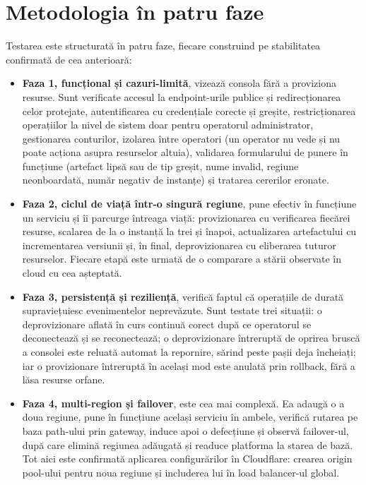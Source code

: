 \documentclass[12pt,a4paper]{report}
\begin{document}
\section{Metodologia în patru faze}
Testarea este structurată în patru faze, fiecare construind pe stabilitatea confirmată de cea anterioară:

\begin{itemize}
	\item \textbf{Faza 1, funcțional și cazuri-limită}, vizează consola fără a proviziona resurse. Sunt verificate accesul la endpoint-urile publice și redirecționarea celor protejate, autentificarea cu credențiale corecte și greșite, restricționarea operațiilor la nivel de sistem doar pentru operatorul administrator, gestionarea conturilor, izolarea între operatori (un operator nu vede și nu poate acționa asupra resurselor altuia), validarea formularului de punere în funcțiune (artefact lipsă sau de tip greșit, nume invalid, regiune neonboardată, număr negativ de instanțe) și tratarea cererilor eronate.
	\item \textbf{Faza 2, ciclul de viață într-o singură regiune}, pune efectiv în funcțiune un serviciu și îi parcurge întreaga viață: provizionarea cu verificarea fiecărei resurse, scalarea de la o instanță la trei și înapoi, actualizarea artefactului cu incrementarea versiunii și, în final, deprovizionarea cu eliberarea tuturor resurselor. Fiecare etapă este urmată de o comparare a stării observate în cloud cu cea așteptată.
	\item \textbf{Faza 3, persistență și reziliență}, verifică faptul că operațiile de durată supraviețuiesc evenimentelor neprevăzute. Sunt testate trei situații: o deprovizionare aflată în curs continuă corect după ce operatorul se deconectează și se reconectează; o deprovizionare întreruptă de oprirea bruscă a consolei este reluată automat la repornire, sărind peste pașii deja încheiați; iar o provizionare întreruptă în același mod este anulată prin rollback, fără a lăsa resurse orfane.
	\item \textbf{Faza 4, multi-region și failover}, este cea mai complexă. Ea adaugă o a doua regiune, pune în funcțiune același serviciu în ambele, verifică rutarea pe baza path-ului prin gateway, induce apoi o defecțiune și observă failover-ul, după care elimină regiunea adăugată și readuce platforma la starea de bază. Tot aici este confirmată aplicarea configurărilor în Cloudflare: crearea origin pool-ului pentru noua regiune și includerea lui în load balancer-ul global.
\end{itemize}
\end{document}
